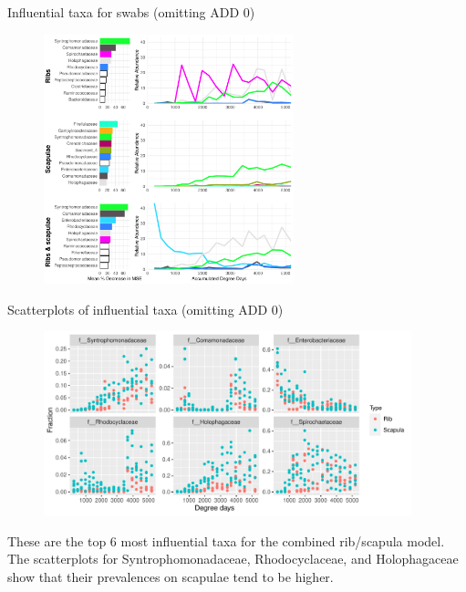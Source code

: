 \documentclass{beamer}
\begin{document}
\begin{frame}{Influential taxa for swabs (omitting ADD 0)}

  \begin{center}
    \begin{figure}
      \includegraphics[height=2.85in]
        {w_bones/bacteria/use_families/hl_combined_family_no_baseline_6panels}
    \end{figure}
  \end{center}

\end{frame}



\begin{frame}{Scatterplots of influential taxa (omitting ADD 0)}

  \begin{center}
    \begin{figure}
      \includegraphics[height=2.1in]
        {w_bones/bacteria/use_families/both_ribs_scapulae/no_baseline/infl_combined_bone_no_baseline_family_scatter}
    \end{figure}
  \end{center}

  \vspace{0.1in}

  \footnotesize{ \noindent These are the top 6 most influential taxa for the
    combined rib/scapula model.  The scatterplots for Syntrophomonadaceae,
    Rhodocyclaceae, and Holophagaceae show that their prevalences on scapulae
    tend to be higher.
    }

\end{frame}
\end{document}
